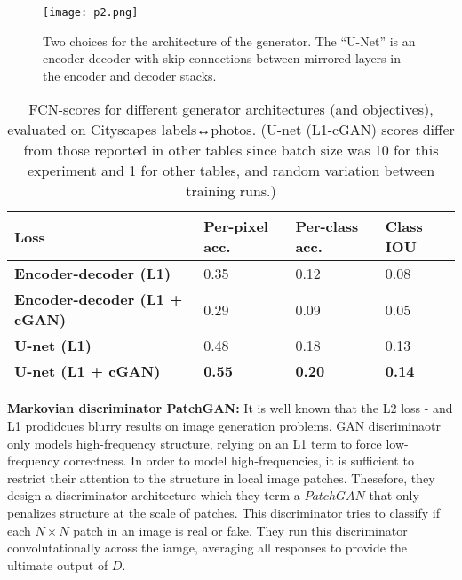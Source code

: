 \documentclass[10pt,twocolumn,letterpaper]{article}
\begin{document}
\begin{figure}[hb]
\begin{center}
\texttt{[image: p2.png]}
\end{center}
\caption{Two choices for the architecture of the generator. The ``U-Net'' is an encoder-decoder with skip connections between mirrored layers in the encoder and decoder stacks.}
\label{fig2}
\end{figure}

\begin{table}
\scriptsize
\begin{center}
\begin{tabular}{p{3.5cm}p{1.2cm}p{1.2cm}p{1cm}}
  {\bf Loss} & {\bf Per-pixel acc.} & {\bf Per-class acc.} & {\bf Class IOU} \\ 
  \hline
  {\bf Encoder-decoder (L1)} & 0.35 & 0.12 & 0.08 \\
  {\bf Encoder-decoder (L1 + cGAN)} & 0.29 & 0.09 & 0.05 \\
  {\bf U-net (L1)} & 0.48 & 0.18 & 0.13 \\
  {\bf U-net (L1 + cGAN)} & {\bf 0.55} & {\bf 0.20} & {\bf 0.14}\\
\end{tabular}
\end{center}
\caption{FCN-scores for different generator architectures (and objectives), evaluated on Cityscapes labels↔photos. (U-net (L1-cGAN) scores differ from those reported in other tables since batch size was 10 for this experiment and 1 for other tables, and random variation between training runs.)}
\label{tab1}
\end{table}

{\bf Markovian discriminator {PatchGAN}:} It is well known that the L2 loss - and L1 prodidcues blurry results on image generation problems. GAN discriminaotr only models high-frequency structure, relying on an L1 term to force low-frequency correctness. In order to model high-frequencies, it is sufficient to restrict their attention to the structure in local image patches. Thesefore, they design a discriminator architecture which they term a $PatchGAN$ that only penalizes structure at the scale of patches. This discriminator tries to classify if each $N\times N$ patch in an image is real or fake. They run this discriminator convolutationally across the iamge, averaging all responses to provide the ultimate output of $D$.


{\small


}
\end{document}
